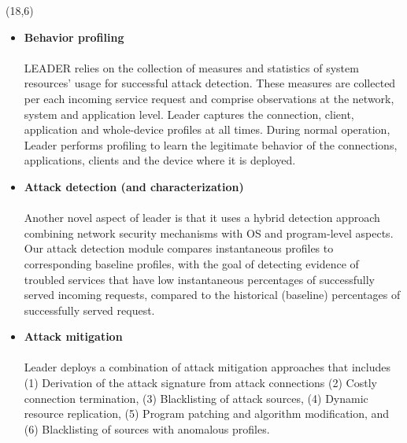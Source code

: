 \documentclass{article}
\def\orangehead#1{\begin{center}\noindent{\LARGE\color{orange} #1}\end{center}}
\renewcommand{\LARGE}{\fontsize{43}{54}\selectfont}
\begin{document}
\begin{textblock}{8}(18,6)
\begin{tcolorbox}[boxsep=6pt, colback=orange!30!white]
	\orangehead{\textbf{\\Methodology\\\\}}
	
	\begin{itemize}
		\item \textbf{Behavior profiling}
\\
\\LEADER relies on the collection of measures and statistics of system resources’ usage for successful attack detection. These measures are collected per each incoming service request and comprise observations at the network, system and application level. Leader captures the connection, client, application and whole-device profiles at all times. During normal operation, Leader performs profiling to learn the legitimate behavior of the connections, applications, clients and the device where it is deployed.\\
		\item \textbf{ Attack detection (and characterization)}
		\\
		\\Another novel aspect of leader is that it uses a hybrid detection approach combining network security mechanisms with OS and program-level aspects. Our attack detection module compares instantaneous profiles to corresponding baseline profiles, with the goal of detecting evidence of troubled services that have low instantaneous percentages of successfully served incoming requests, compared to the historical (baseline) percentages of successfully served request.\\
		\item \textbf{Attack mitigation}
		\\
		\\Leader deploys a combination of attack mitigation approaches that includes (1) Derivation of the attack signature from attack connections (2) Costly connection termination, (3) Blacklisting of attack sources, (4) Dynamic resource
replication, (5) Program patching and algorithm modification, and (6) Blacklisting of sources with anomalous profiles.\\
	\end{itemize}

	\end{tcolorbox}
\end{textblock}
\end{document}
